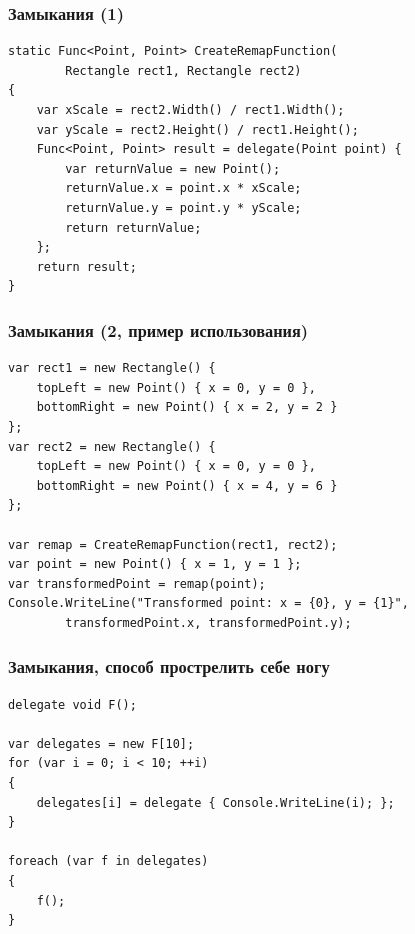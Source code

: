 \documentclass{../../slides-style}
\begin{document}
    \begin{frame}[fragile]
        \frametitle{Замыкания (1)}
        \begin{verbatim}
static Func<Point, Point> CreateRemapFunction(
        Rectangle rect1, Rectangle rect2)
{
    var xScale = rect2.Width() / rect1.Width();
    var yScale = rect2.Height() / rect1.Height();
    Func<Point, Point> result = delegate(Point point) {
        var returnValue = new Point();
        returnValue.x = point.x * xScale;
        returnValue.y = point.y * yScale;
        return returnValue;
    };
    return result;
}
        \end{verbatim}
    \end{frame}

    \begin{frame}[fragile]
        \frametitle{Замыкания (2, пример использования)}
        \begin{small}
            \begin{verbatim}
var rect1 = new Rectangle() {
    topLeft = new Point() { x = 0, y = 0 },
    bottomRight = new Point() { x = 2, y = 2 }
};
var rect2 = new Rectangle() {
    topLeft = new Point() { x = 0, y = 0 },
    bottomRight = new Point() { x = 4, y = 6 }
};

var remap = CreateRemapFunction(rect1, rect2);
var point = new Point() { x = 1, y = 1 };
var transformedPoint = remap(point);
Console.WriteLine("Transformed point: x = {0}, y = {1}", 
        transformedPoint.x, transformedPoint.y);
            \end{verbatim}
        \end{small}
    \end{frame}

    \begin{frame}[fragile]
        \frametitle{Замыкания, способ прострелить себе ногу}
        \begin{small}
            \begin{verbatim}
delegate void F();

var delegates = new F[10];
for (var i = 0; i < 10; ++i)
{
    delegates[i] = delegate { Console.WriteLine(i); };
}

foreach (var f in delegates)
{
    f();
}
            \end{verbatim}
        \end{small}
    \end{frame}
\end{document}
